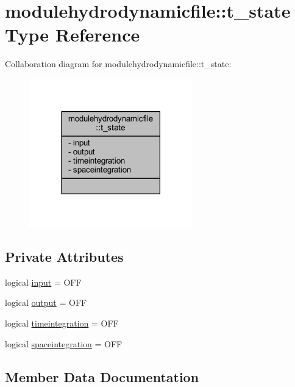 \hypertarget{structmodulehydrodynamicfile_1_1t__state}{}\section{modulehydrodynamicfile\+:\+:t\+\_\+state Type Reference}
\label{structmodulehydrodynamicfile_1_1t__state}


Collaboration diagram for modulehydrodynamicfile\+:\+:t\+\_\+state\+:\nopagebreak
\begin{figure}[H]
\begin{center}
\leavevmode
\includegraphics[width=201pt]{structmodulehydrodynamicfile_1_1t__state__coll__graph}
\end{center}
\end{figure}
\subsection*{Private Attributes}
\begin{DoxyCompactItemize}
\item 
logical \mbox{\hyperlink{structmodulehydrodynamicfile_1_1t__state_abf744e5aa03d617c61d678e94ba6e3ce}{input}} = O\+FF
\item 
logical \mbox{\hyperlink{structmodulehydrodynamicfile_1_1t__state_a0d1c12fe828fe7a0388fe00ced89caed}{output}} = O\+FF
\item 
logical \mbox{\hyperlink{structmodulehydrodynamicfile_1_1t__state_aa433a9846d029b67ab9e2cf9b23a1bdc}{timeintegration}} = O\+FF
\item 
logical \mbox{\hyperlink{structmodulehydrodynamicfile_1_1t__state_a8215ceae386d80a9eebd3e52bb980a46}{spaceintegration}} = O\+FF
\end{DoxyCompactItemize}


\subsection{Member Data Documentation}
\mbox{\label{structmodulehydrodynamicfile_1_1t__state_abf744e5aa03d617c61d678e94ba6e3ce}} 
